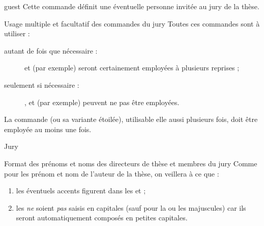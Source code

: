 \begin{docCommand}{guest}{}
  Cette commande définit une éventuelle personne invitée au jury de la thèse.
\end{docCommand}
%
\begin{dbwarning}{Usage multiple et facultatif des commandes du
    jury}{}
  Toutes ces commandes sont à utiliser :
  \begin{description}
  \item[autant de fois que nécessaire :]
     et  (par exemple) seront
    certainement employées à plusieurs reprises ;
  \item[seulement si nécessaire :]
    ,  et  (par
    exemple) peuvent ne pas être employées.
  \end{description}
  La commande  (ou sa variante étoilée), utilisable elle
  aussi plusieurs fois, doit être employée au moins une fois.
\end{dbwarning}

\begin{dbexample}{Jury}{}
\begin{preamblecode}[listing options={deletekeywords={[5]supervisor,cosupervisor,committeepresident}}]
%
%
%
\end{preamblecode}
\end{dbexample}

\begin{dbwarning}{Format des prénoms et noms des directeurs de thèse et membres du jury}{}
  Comme pour les prénom et nom de l'auteur de la thèse, on veillera à ce que :
  \begin{enumerate}
  \item les éventuels accents figurent dans les  et ;
  \item les  \emph{ne} soient \emph{pas} saisis en capitales (sauf
    pour la ou les majuscules) car ils seront automatiquement composés en
    petites capitales.
  \end{enumerate}
\end{dbwarning}

